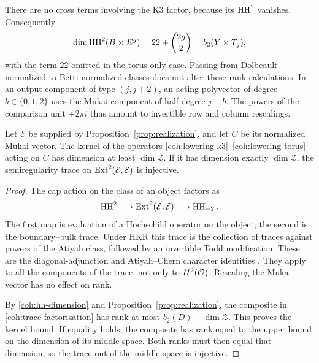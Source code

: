There are no cross terms involving the K3 factor, because its
\(\operatorname{HH}^1\) vanishes.  Consequently
\begin{equation}\label{coh:hh-dimension}
 \dim\operatorname{HH}^2(B\times E^g)=22+\binom{2g}{2}=b_2(Y\times T_g),
\end{equation}
with the term \(22\) omitted in the torus-only case.  Passing from
Dolbeault-normalized to Betti-normalized classes does not alter these
rank calculations.  In an output component of type \((j,j+2)\), an
acting polyvector of degree \(b\in\{0,1,2\}\) uses the Mukai
component of half-degree \(j+b\).  The powers of the comparison unit
\(\pm2\pi i\) thus amount to invertible row and column rescalings.

\begin{lemma}\label{coh:rank-trace}
Let \(\mathcal E\) be supplied by
Proposition~\ref{prop:realization}, and let \(C\) be its normalized
Mukai vector.  The kernel of the operators
\eqref{coh:lowering-k3}--\eqref{coh:lowering-torus} acting on \(C\)
has dimension at least \(\dim\mathcal Z\).  If it has dimension
exactly \(\dim\mathcal Z\), the semiregularity trace on
\(\operatorname{Ext}^2(\mathcal E,\mathcal E)\) is injective.
\end{lemma}

\begin{proof}
The cap action on the class of an object factors as
\begin{equation}\label{coh:trace-factorization}
 \operatorname{HH}^2\longrightarrow\operatorname{Ext}^2(\mathcal E,\mathcal E)
       \longrightarrow\operatorname{HH}_{-2}.
\end{equation}
The first map is evaluation of a Hochschild operator on the object;
the second is the boundary--bulk trace.  Under HKR this trace is the
collection of traces against powers of the Atiyah class, followed by
an invertible Todd modification.  These are the diagonal-adjunction
and Atiyah--Chern character identities
\cite{CaldararuMukaiII,BuchweitzFlennerHH}.
They apply to all the components of the trace, not only to
\(H^2(\mathcal O)\).  Rescaling the Mukai vector has no effect on rank.

By \eqref{coh:hh-dimension} and Proposition~\ref{prop:realization},
the composite in \eqref{coh:trace-factorization} has rank at most
\(b_2(D)-\dim\mathcal Z\).  This proves the kernel bound.  If
equality holds, the composite has rank equal to the upper bound on
the dimension of its middle space.  Both ranks must then equal that
dimension, so the trace out of the middle space is injective.
\end{proof}

